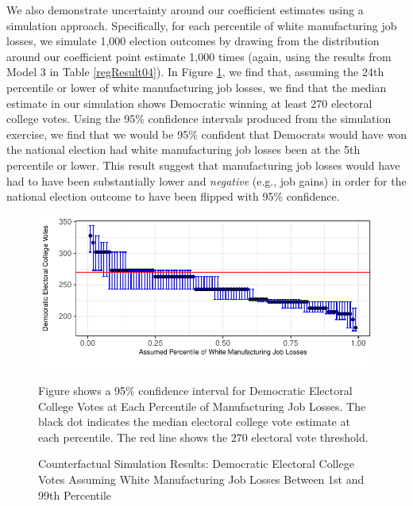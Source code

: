 \documentclass[]{AEA}
\begin{document}
We also demonstrate uncertainty around our coefficient estimates using a
simulation approach. Specifically, for each percentile of white
manufacturing job losses, we simulate 1,000 election outcomes by drawing
from the distribution around our coefficient point estimate 1,000 times
(again, using the results from Model 3 in Table \ref{regResult04}). In
Figure \ref{counterfactual2}, we find that, assuming the 24th percentile
or lower of white manufacturing job losses, we find that the median
estimate in our simulation shows Democratic winning at least 270
electoral college votes. Using the 95\% confidence intervals produced
from the simulation exercise, we find that we would be 95\% confident
that Democrats would have won the national election had white
manufacturing job losses been at the 5th percentile or lower. This
result suggest that manufacturing job losses would have had to have been
substantially lower and \emph{negative} (e.g., job gains) in order for
the national election outcome to have been flipped with 95\% confidence.

\FloatBarrier
\begin{figure} 

\caption{Counterfactual Simulation Results: Democratic Electoral College Votes Assuming White Manufacturing Job Losses Between 1st and 99th Percentile }
\label{counterfactual2}

\begin{center}\includegraphics{Final-Draft_files/figure-latex/unnamed-chunk-7-1} \end{center}



\FloatBarrier
\begin{figurenotes}
Figure shows a 95\% confidence interval for Democratic Electoral College Votes at Each Percentile of Manufacturing Job Losses. The black dot indicates the median electoral college vote estimate at each percentile. The red line shows the 270 electoral vote threshold.
\end{figurenotes}
\end{figure}
\FloatBarrier
\end{document}
